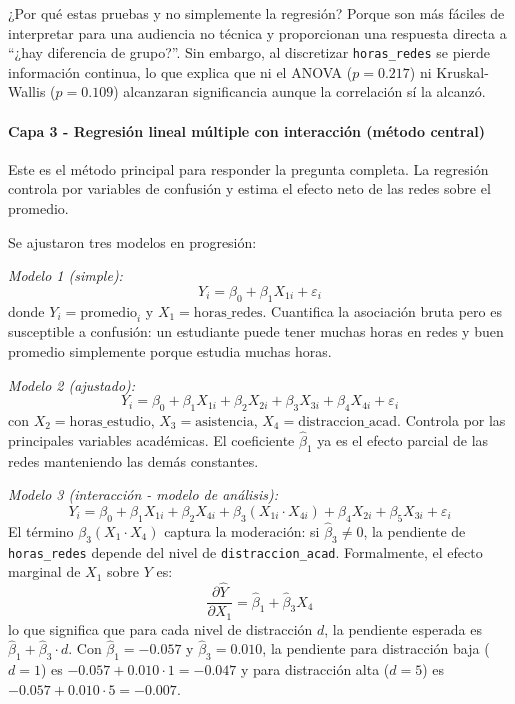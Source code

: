 \documentclass[12pt]{article}
\begin{document}
¿Por qué estas pruebas y no simplemente la regresión? Porque son más fáciles de interpretar para una audiencia no técnica y proporcionan una respuesta directa a ``¿hay diferencia de grupo?''. Sin embargo, al discretizar \texttt{horas\_redes} se pierde información continua, lo que explica que ni el ANOVA (\(p = 0.217\)) ni Kruskal-Wallis (\(p = 0.109\)) alcanzaran significancia aunque la correlación sí la alcanzó.

\paragraph{Capa 3 - Regresión lineal múltiple con interacción (método central)}

Este es el método principal para responder la pregunta completa. La regresión controla por variables de confusión y estima el efecto neto de las redes sobre el promedio.

Se ajustaron tres modelos en progresión:

\textit{Modelo 1 (simple):}
\[
Y_i = \beta_0 + \beta_1 X_{1i} + \varepsilon_i
\]
donde \(Y_i = \text{promedio}_i\) y \(X_1 = \text{horas\_redes}\). Cuantifica la asociación bruta pero es susceptible a confusión: un estudiante puede tener muchas horas en redes y buen promedio simplemente porque estudia muchas horas.

\textit{Modelo 2 (ajustado):}
\[
Y_i = \beta_0 + \beta_1 X_{1i} + \beta_2 X_{2i} + \beta_3 X_{3i} + \beta_4 X_{4i} + \varepsilon_i
\]
con \(X_2 = \text{horas\_estudio}\), \(X_3 = \text{asistencia}\), \(X_4 = \text{distraccion\_acad}\). Controla por las principales variables académicas. El coeficiente \(\hat\beta_1\) ya es el efecto parcial de las redes manteniendo las demás constantes.

\textit{Modelo 3 (interacción - modelo de análisis):}
\[
Y_i = \beta_0 + \beta_1 X_{1i} + \beta_2 X_{4i} + \beta_3 (X_{1i} \cdot X_{4i}) + \beta_4 X_{2i} + \beta_5 X_{3i} + \varepsilon_i
\]
El término \(\beta_3 (X_1 \cdot X_4)\) captura la moderación: si \(\hat\beta_3 \neq 0\), la pendiente de \texttt{horas\_redes} depende del nivel de \texttt{distraccion\_acad}. Formalmente, el efecto marginal de \(X_1\) sobre \(Y\) es:
\[
\frac{\partial \hat{Y}}{\partial X_1} = \hat\beta_1 + \hat\beta_3 X_4
\]
lo que significa que para cada nivel de distracción \(d\), la pendiente esperada es \(\hat\beta_1 + \hat\beta_3 \cdot d\). Con \(\hat\beta_1 = -0.057\) y \(\hat\beta_3 = 0.010\), la pendiente para distracción baja (\(d=1\)) es \(-0.057 + 0.010 \cdot 1 = -0.047\) y para distracción alta (\(d=5\)) es \(-0.057 + 0.010 \cdot 5 = -0.007\).
\end{document}
